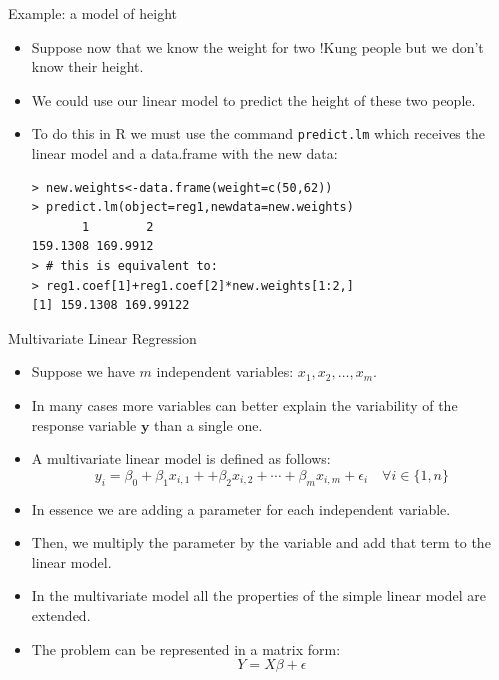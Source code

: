 \documentclass[handout]{beamer}
\begin{document}
\begin{frame}[fragile]{Example: a model of height}
\scriptsize{
\begin{itemize}
\item  Suppose now that we know the weight for two !Kung people but we don't know their height.

\item  We could use our linear model to predict the height of these two people.

\item To do this in R we must use the command \verb+predict.lm+ which receives the linear model and a data.frame with the new data:
\begin{verbatim}
> new.weights<-data.frame(weight=c(50,62))
> predict.lm(object=reg1,newdata=new.weights)
       1        2 
159.1308 169.9912 
> # this is equivalent to:
> reg1.coef[1]+reg1.coef[2]*new.weights[1:2,]
[1] 159.1308 169.99122
\end{verbatim}

 
 \end{itemize}
 

} 
\end{frame}


\begin{frame}{Multivariate Linear Regression}
\scriptsize{
\begin{itemize}
 \item Suppose we have $m$ independent variables:  $x_1,x_2,\dots,x_m$.
 \item In many cases more variables can better explain the variability of the response variable $\mathbf{y}$ than a single one.
 \item A multivariate linear model is defined as follows:
 \begin{displaymath}
 y_i=\beta_{0}+\beta_{1}x_{i,1}+ +\beta_{2}x_{i,2} + \cdots + \beta_{m}x_{i,m} +  \epsilon_i \quad \forall i \in \{1,n\}
\end{displaymath}

\item In essence we are adding a parameter for each independent variable.

\item Then, we multiply the parameter by the variable and add that term to the linear model.

\item  In the multivariate model all the properties of the simple linear model are extended.

\item The problem can be represented in a matrix form:
\begin{displaymath}
 Y=X\beta+\epsilon
\end{displaymath}








\end{itemize}
 

}
\end{frame}
\end{document}
